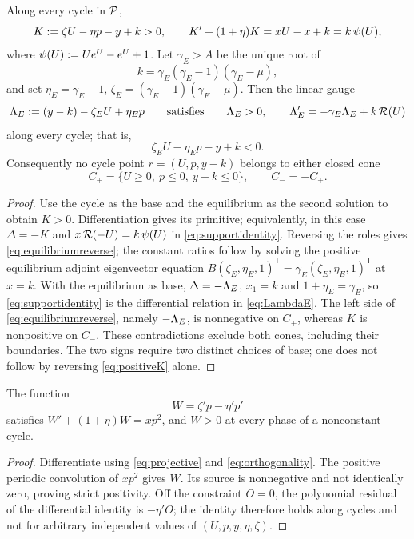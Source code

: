\begin{corollary}\label{cor:cones}
Along every cycle in $\mathcal P$,
\begin{equation}\label{eq:positiveK}
K:=\zeta U-\eta p-y+k>0,\qquad
K'+(1+\eta)K=xU-x+k=k\,\psi(U),
\end{equation}
where $\psi(U):=Ue^U-e^U+1$. Let $\gamma_E>A$ be the unique root of
\[
k=\gamma_E(\gamma_E-1)(\gamma_E-\mu),
\]
and set $\eta_E=\gamma_E-1$, $\zeta_E=(\gamma_E-1)(\gamma_E-\mu)$. Then the linear gauge
\begin{equation}\label{eq:LambdaE}
\Lambda_E:=(y-k)-\zeta_EU+\eta_Ep
\qquad\text{satisfies}\qquad
\Lambda_E>0,\qquad \Lambda_E'=-\gamma_E\Lambda_E+k\,\mathcal R(U)
\end{equation}
along every cycle; that is,
\begin{equation}\label{eq:equilibriumreverse}
\zeta_EU-\eta_Ep-y+k<0.
\end{equation}
Consequently no cycle point $r=(U,p,y-k)$ belongs to either closed cone
\begin{equation}\label{eq:cones}
C_+=\{U\ge0,\ p\le0,\ y-k\le0\},\qquad C_-=-C_+.
\end{equation}
\end{corollary}
\begin{proof}
Use the cycle as the base and the equilibrium as the second solution to obtain $K>0$. Differentiation gives its primitive; equivalently, in this case $\Delta=-K$ and $x\,\mathcal R(-U)=k\,\psi(U)$ in \eqref{eq:supportidentity}. Reversing the roles gives \eqref{eq:equilibriumreverse}; the constant ratios follow by solving the positive equilibrium adjoint eigenvector equation $B(\zeta_E,\eta_E,1)^{\mathsf T}=\gamma_E(\zeta_E,\eta_E,1)^{\mathsf T}$ at $x=k$. With the equilibrium as base, $\Delta=-\Lambda_E$, $x_1=k$ and $1+\eta_E=\gamma_E$, so \eqref{eq:supportidentity} is the differential relation in \eqref{eq:LambdaE}. The left side of \eqref{eq:equilibriumreverse}, namely $-\Lambda_E$, is nonnegative on $C_+$, whereas $K$ is nonpositive on $C_-$. These contradictions exclude both cones, including their boundaries. The two signs require two distinct choices of base; one does not follow by reversing \eqref{eq:positiveK} alone.
\end{proof}

\begin{lemma}\label{lem:curvature}
The function
\begin{equation}\label{eq:curvature}
W=\zeta'p-\eta'p'
\end{equation}
satisfies $W'+(1+\eta)W=xp^2$, and $W>0$ at every phase of a nonconstant cycle.
\end{lemma}
\begin{proof}
Differentiate using \eqref{eq:projective} and \eqref{eq:orthogonality}. The positive periodic convolution of $xp^2$ gives $W$. Its source is nonnegative and not identically zero, proving strict positivity. Off the constraint $O=0$, the polynomial residual of the differential identity is $-\eta'O$; the identity therefore holds along cycles and not for arbitrary independent values of $(U,p,y,\eta,\zeta)$.
\end{proof}
